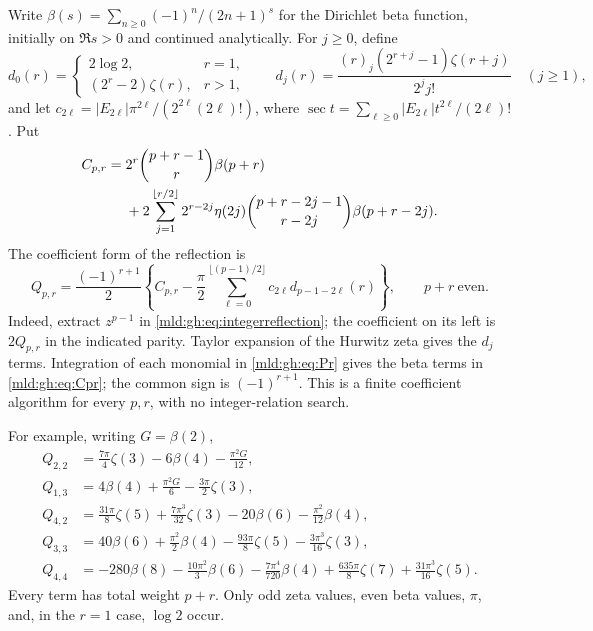 Write $\beta(s)=\sum_{n\ge0}(-1)^n/(2n+1)^s$ for the Dirichlet
beta function, initially on $\Re s>0$ and continued analytically.
For $j\geq0$, define
\[
 d_0(r)=
 \begin{cases}2\log2,&r=1,\\(2^r-2)\zeta(r),&r>1,\end{cases}
 \qquad
 d_j(r)=\frac{(r)_j(2^{r+j}-1)\zeta(r+j)}{2^j j!}
 \quad(j\geq1),
\]
and let
$c_{2\ell}=|E_{2\ell}|\pi^{2\ell}/(2^{2\ell}(2\ell)!)$, where
$\sec t=\sum_{\ell\geq0}|E_{2\ell}|t^{2\ell}/(2\ell)!$.
Put
\begin{align}
 C_{p,r}={}&2^r\binom{p+r-1}{r}\beta(p+r)\notag\\
 &+2\sum_{j=1}^{\lfloor r/2\rfloor}
      2^{r-2j}\eta(2j)
      \binom{p+r-2j-1}{r-2j}\beta(p+r-2j).
      \label{mld:gh:eq:Cpr}
\end{align}
The coefficient form of the reflection is
\begin{equation}\label{mld:gh:eq:finiteparity}
 \boxed{
 Q_{p,r}=\frac{(-1)^{r+1}}2
 \left\{C_{p,r}-\frac\pi2
   \sum_{\ell=0}^{\lfloor(p-1)/2\rfloor}
        c_{2\ell}d_{p-1-2\ell}(r)\right\},
 \qquad p+r\ \text{even}.}
\end{equation}
Indeed, extract $z^{p-1}$ in \eqref{mld:gh:eq:integerreflection}; the
coefficient on its left is $2Q_{p,r}$ in the indicated parity.
Taylor expansion of the Hurwitz zeta gives the $d_j$ terms.
Integration of each monomial in \eqref{mld:gh:eq:Pr} gives the beta
terms in \eqref{mld:gh:eq:Cpr}; the common sign is $(-1)^{r+1}$.
This is a finite coefficient algorithm for every $p,r$, with no
integer-relation search.

For example, writing $G=\beta(2)$,
\begin{align}
 Q_{2,2}&=\frac{7\pi}{4}\zeta(3)-6\beta(4)-\frac{\pi^2G}{12},
       \label{mld:gh:eq:Q22}\\
 Q_{1,3}&=4\beta(4)+\frac{\pi^2G}{6}
                     -\frac{3\pi}{2}\zeta(3),\\
 Q_{4,2}&=\frac{31\pi}{8}\zeta(5)+\frac{7\pi^3}{32}\zeta(3)
                     -20\beta(6)-\frac{\pi^2}{12}\beta(4),\\
 Q_{3,3}&=40\beta(6)+\frac{\pi^2}{2}\beta(4)
                     -\frac{93\pi}{8}\zeta(5)
                     -\frac{3\pi^3}{16}\zeta(3),\\
 Q_{4,4}&=-280\beta(8)-\frac{10\pi^2}{3}\beta(6)
                     -\frac{7\pi^4}{720}\beta(4)
                     +\frac{635\pi}{8}\zeta(7)
                     +\frac{31\pi^3}{16}\zeta(5).
\end{align}
Every term has total weight $p+r$. Only odd zeta values, even beta
values, $\pi$, and, in the $r=1$ case, $\log2$ occur.

